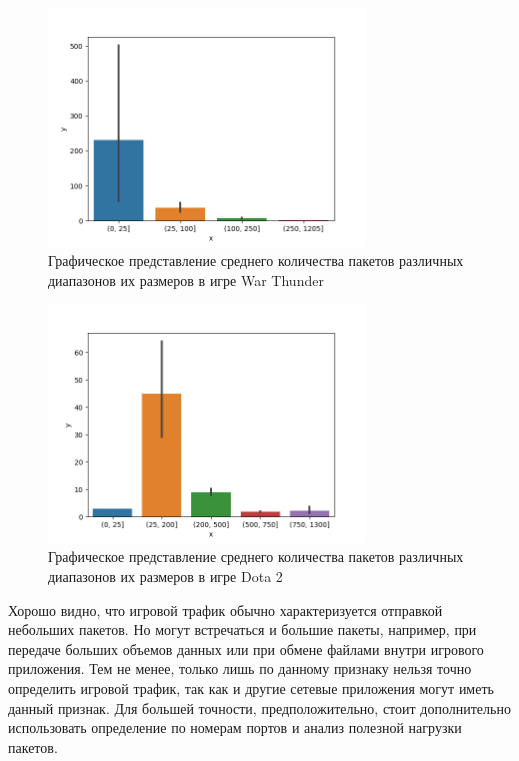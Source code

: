 \documentclass[bachelor, och, coursework]{SCWorks}
\begin{document}
\begin{figure}[H]
    \centering
    \includegraphics[width=0.75\textwidth]{warthunder.png}
    \caption{Графическое представление среднего количества пакетов различных диапазонов их размеров в игре War Thunder}
    \label{wt}
\end{figure}

\begin{figure}[H]
    \centering
    \includegraphics[width=0.75\textwidth]{dota2.png}
    \caption{Графическое представление среднего количества пакетов различных диапазонов их размеров в игре Dota 2}
    \label{dota2}
\end{figure}

Хорошо видно, что игровой трафик обычно характеризуется отправкой небольших пакетов. Но могут встречаться и большие пакеты, например, при передаче больших объемов данных или при обмене файлами внутри игрового приложения. Тем не менее, только лишь по данному признаку нельзя точно определить игровой трафик, так как и другие сетевые приложения могут иметь данный признак. Для большей точности, предположительно, стоит дополнительно использовать определение по номерам портов и анализ полезной нагрузки пакетов. 
\end{document}
